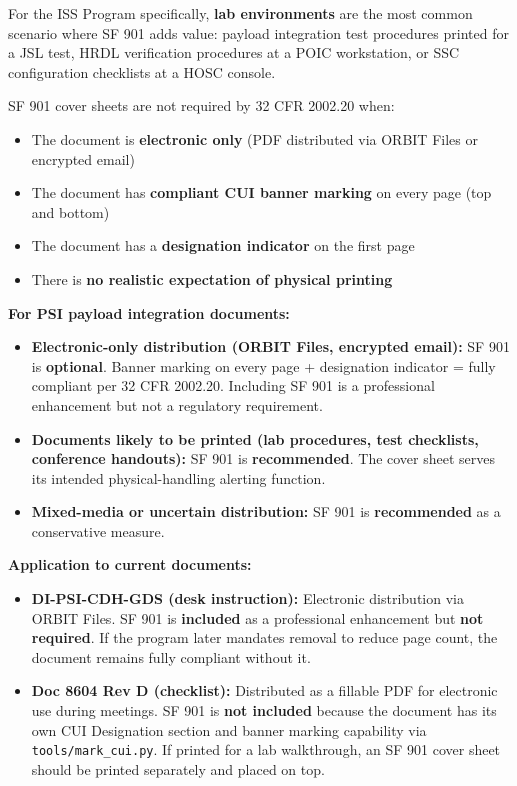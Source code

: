 {\begin{enumerate}
For the ISS Program specifically, \textbf{lab environments} are the most common scenario where SF 901 adds value: payload integration test procedures printed for a JSL test, HRDL verification procedures at a POIC workstation, or SSC configuration checklists at a HOSC console.


SF 901 cover sheets are not required by 32 CFR 2002.20 when:

\begin{itemize}
    \item The document is \textbf{electronic only} (PDF distributed via ORBIT Files or encrypted email)
    \item The document has \textbf{compliant CUI banner marking} on every page (top and bottom)
    \item The document has a \textbf{designation indicator} on the first page
    \item There is \textbf{no realistic expectation of physical printing}
\end{itemize}


\textbf{For PSI payload integration documents:}

\begin{itemize}
    \item \textbf{Electronic-only distribution (ORBIT Files, encrypted email):} SF 901 is \textbf{optional}. Banner marking on every page + designation indicator = fully compliant per 32 CFR 2002.20. Including SF 901 is a professional enhancement but not a regulatory requirement.
    \item \textbf{Documents likely to be printed (lab procedures, test checklists, conference handouts):} SF 901 is \textbf{recommended}. The cover sheet serves its intended physical-handling alerting function.
    \item \textbf{Mixed-media or uncertain distribution:} SF 901 is \textbf{recommended} as a conservative measure.
\end{itemize}

\textbf{Application to current documents:}

\begin{itemize}
    \item \textbf{DI-PSI-CDH-GDS (desk instruction):} Electronic distribution via ORBIT Files. SF 901 is \textbf{included} as a professional enhancement but \textbf{not required}. If the program later mandates removal to reduce page count, the document remains fully compliant without it.
    \item \textbf{Doc 8604 Rev D (checklist):} Distributed as a fillable PDF for electronic use during meetings. SF 901 is \textbf{not included} because the document has its own CUI Designation section and banner marking capability via \texttt{tools/mark\_cui.py}. If printed for a lab walkthrough, an SF 901 cover sheet should be printed separately and placed on top.
\end{itemize}


\end{enumerate}}
